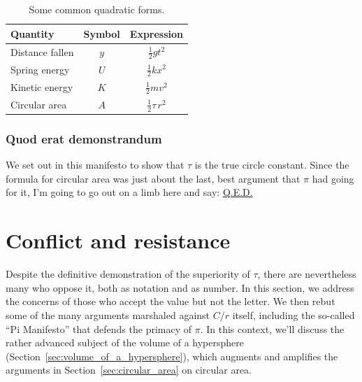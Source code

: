 \begin{table}
\begin{center}
\begin{tabular}{lcc}
Quantity & Symbol & Expression \\ \hline
Distance fallen & $y$ & $\textstyle{\frac{1}{2}}gt^2$ \smallskip \\
Spring energy & $U$ & $\textstyle{\frac{1}{2}}kx^2$ \smallskip \\
Kinetic energy & $K$ & $\textstyle{\frac{1}{2}}mv^2$ \smallskip \\
Circular area & $A$ & $\textstyle{\frac{1}{2}}\tau\,r^2$
\end{tabular}
\end{center}
\caption{Some common quadratic forms.\label{table:quadratic_forms}}
\end{table}

    \subsubsection{Quod erat demonstrandum} %
    \label{sec:quod_erat_demonstrandum}

We set out in this manifesto to show that $\tau$ is the true circle constant. Since the formula for circular area was just about the last, best argument that $\pi$ had going for it, I'm going to go out on a limb here and say: \href{https://en.wikipedia.org/wiki/Q.E.D.}{Q.E.D.}



\section{Conflict and resistance} %
\label{sec:conflict_and_resistance}

Despite the definitive demonstration of the superiority of $\tau$, there are nevertheless many who oppose it, both as notation and as number. In this section, we address the concerns of those who accept the value but not the letter. We then rebut some of the many arguments marshaled against $C/r$ itself, including the so-called ``Pi Manifesto'' that defends the primacy of $\pi$. In this context, we'll discuss the rather advanced subject of the volume of a hypersphere (Section~\ref{sec:volume_of_a_hypersphere}), which augments and amplifies the arguments in Section~\ref{sec:circular_area} on circular area.

